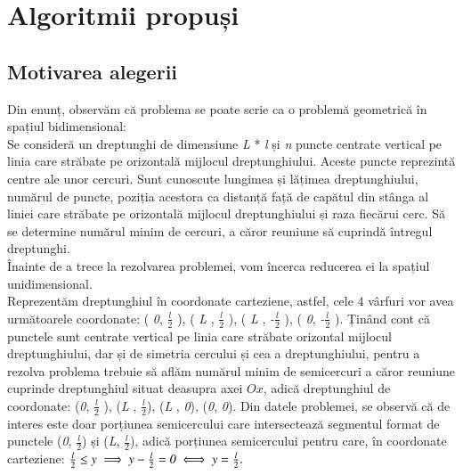 \documentclass[14ppt]{article}
\begin{document}
 
 \section{Algoritmii propuși}
\subsection{Motivarea alegerii}
Din enunț, observăm că problema se poate scrie ca o problemă geometrică în spațiul bidimensional: \\ Se consideră un dreptunghi de dimensiune \emph{L} *  \emph{l} și \emph{n} puncte centrate vertical pe linia care străbate pe orizontală mijlocul dreptunghiului. Aceste puncte reprezintă centre ale unor cercuri. Sunt cunoscute lungimea și lățimea dreptunghiului, numărul de puncte, poziția acestora ca distanță față de capătul din stânga al liniei care străbate pe orizontală mijlocul dreptunghiului și raza fiecărui cerc. Să se determine numărul minim de cercuri, a căror reuniune să cuprindă întregul dreptunghi. \\
Înainte de a trece la rezolvarea problemei, vom încerca reducerea ei la spațiul unidimensional. \\
Reprezentăm dreptunghiul în coordonate carteziene, astfel, cele 4 vârfuri vor avea următoarele coordonate: ( \emph{0}, \emph{$\frac{l}{2}$} ), ( \emph{L} , \emph{$\frac{l}{2}$} ), ( \emph{L} , \emph{-$\frac{l}{2}$} ),  ( \emph{0}, \emph{-$\frac{l}{2}$} ). Ținând cont că punctele sunt centrate vertical pe linia care străbate orizontal mijlocul dreptunghiului, dar și de simetria cercului și cea a dreptunghiului, pentru a rezolva problema trebuie să aflăm numărul minim de semicercuri a căror reuniune cuprinde dreptunghiul situat deasupra axei \emph{$Ox$}, adică dreptunghiul de coordonate: (\emph{0}, \emph{$\frac{l}{2}$} ), (\emph{L} , \emph{$\frac{l}{2}$}), (\emph{L} , \emph{0}),  (\emph{0}, \emph{0}). Din datele problemei, se observă că de interes este doar porțiunea semicercului care intersectează segmentul format de punctele (\emph{0}, \emph{$\frac{l}{2}$}) și (\emph{L}, \emph{$\frac{l}{2}$}), adică porțiunea semicercului pentru care, în coordonate carteziene: $\emph{$\frac{l}{2}$} \leq y \implies y - \emph{$\frac{l}{2}$} = \emph{0} \iff y = \emph{$\frac{l}{2}$}.$ \\ 
\end{document}
